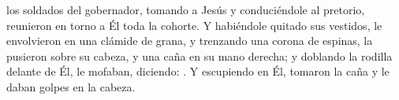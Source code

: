  los soldados del gobernador, tomando a Jesús y conduciéndole al pretorio, reunieron en torno a Él toda la cohorte. Y habiéndole quitado sus vestidos,
le envolvieron en una clámide de grana, y trenzando una corona de espinas, la pusieron sobre su cabeza, y una caña en su mano derecha; y doblando la rodilla delante de Él,
le mofaban, diciendo: . Y escupiendo en Él, tomaron la caña y le daban golpes en la cabeza.